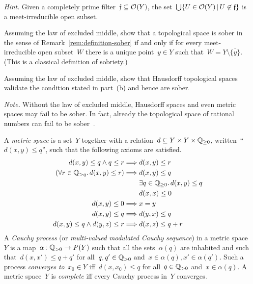 \documentclass{ws-rv9x6}
\begin{document}
{\begin{exercise}
\begin{alphlist}[(c)]
{\scriptsize\emph{Hint.} Given a completely prime filter~$\mathfrak{f} \subseteq
\mathcal{O}(Y)$, the set~$\bigcup\{ U \in \mathcal{O}(Y) \,|\, U \not\in \mathfrak{f} \}$ is a
meet-irreducible open subset.\par}
\item Assuming the law of excluded middle, show that a topological space is
sober in the sense of Remark~\ref{rem:definition-sober} if and only if for
every meet-irreducible open subset~$W$ there is a unique point~$y \in Y$ such
that~$W = Y \setminus \overline{\{y\}}$.
(This is a classical definition of sobriety.)

\item Assuming the law of excluded middle, show that Hausdorff topological
spaces validate the condition stated in part~(b) and hence are sober.
\end{alphlist}
{\scriptsize\emph{Note.} Without the law of excluded middle, Hausdorff spaces
and even metric spaces may fail to be sober. In fact, already the topological
space of rational numbers can fail to be
sober~\cite[Example~8.14(iv)]{fourman-scott:sheaves-and-logic}.\par}
\end{exercise}

\begin{exercise}%
A \emph{metric space} is a set~$Y$ together with a relation~$d \subseteq Y
\times Y \times \mathbb{Q}_{\geq0}$, written~``$d(x,y) \leq q$'', such that the
following axioms are satisfied.
\begin{align*}
  d(x,y) \leq q \wedge q \leq r &\Longrightarrow d(x,y) \leq r \\
  (\forall r \in \mathbb{Q}_{> q}\mathpunct{.} d(x,y) \leq r) &\Longrightarrow d(x,y) \leq q \\
  &\mathrel{\phantom{\Longrightarrow}} \exists q \in \mathbb{Q}_{\geq0}\mathpunct{.} d(x,y) \leq q \\
  &\mathrel{\phantom{\Longrightarrow}} d(x,x) \leq 0 \\
  d(x,y) \leq 0 &\Longrightarrow x = y \\
  d(x,y) \leq q &\Longrightarrow d(y,x) \leq q \\
  d(x,y) \leq q \wedge d(y,z) \leq r &\Longrightarrow d(x,z) \leq q+r
\end{align*}
A \emph{Cauchy process} (or \emph{multi-valued modulated Cauchy sequence}) in a metric
space~$Y$ is a map~$\alpha : \mathbb{Q}_{>0} \to P(Y)$ such that all the sets~$\alpha(q)$
are inhabited and such that~$d(x,x') \leq q + q'$ for all~$q,q' \in \mathbb{Q}_{>0}$
and~$x \in \alpha(q), x' \in \alpha(q')$. Such a process \emph{converges
to}~$x_0 \in Y$ iff~$d(x,x_0) \leq q$ for all~$q \in \mathbb{Q}_{>0}$
and~$x \in \alpha(q)$. A metric space~$Y$ is \emph{complete} iff every Cauchy
process in~$Y$ converges.


\end{exercise}}
\end{document}
